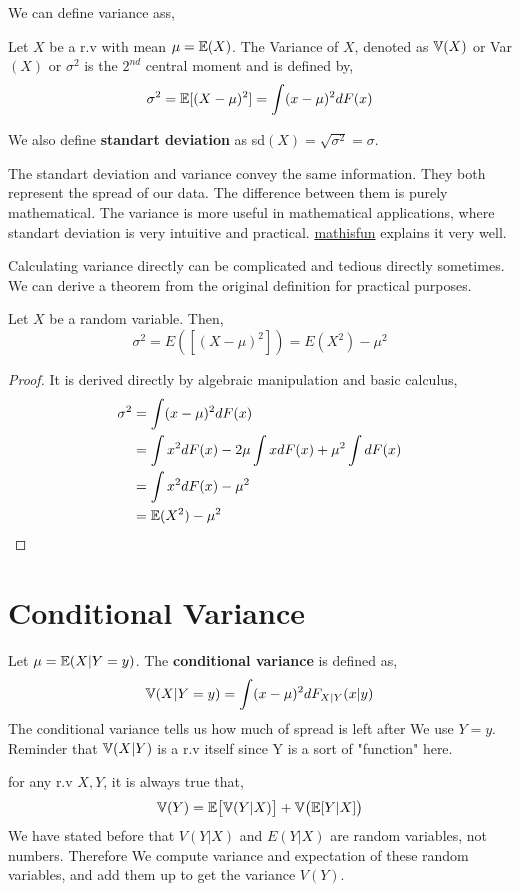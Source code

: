 We can define variance ass,
\begin{definition}
    Let $X$ be a r.v with mean $\mu = {\mathbb{E}}(X)$. The Variance of $X$, denoted as ${\mathbb{V}}(X)$ or  Var$(X)$ or $\sigma ^2$ is the $2^{nd}$ central moment and is defined by,
    \[ \sigma^2 = {\mathbb{E}} [(X- \mu)^2] = \int (x -\mu)^2 dF(x)\]
    
    We also define \textbf{standart deviation} as sd$(X) = \sqrt{\sigma^2}= \sigma$.
\end{definition}
The standart deviation and variance convey the same information. They both represent the spread of our data. 
The difference between them is purely mathematical. The variance is more useful in mathematical applications, where standart deviation is very intuitive and practical. 
\href{https://www.mathsisfun.com/data/standard-deviation.html}{mathisfun} explains it very well.
\par
Calculating variance directly can be complicated  and tedious directly sometimes. We can derive a theorem from the original definition for practical purposes.
\begin{theorem}
    Let $X$ be a random variable. Then,
    \[\sigma^2 = E([ (X-\mu)^2]) = E(X^2) - \mu^2\]
    \begin{proof}
        It is derived directly by algebraic manipulation and basic calculus,
        \begin{align*}
            \sigma^2 &= \int (x- \mu)^2 dF(x)  \\
                     &= \int x^2 dF(x) -2\mu \int x dF(x) + \mu^2 \int dF(x) \\
                     &= \int x^2 dF(x) - \mu^2 \\
                     &= {\mathbb{E}}(X^2) - \mu^2
        \end{align*}
    \end{proof}
\end{theorem}
\section{Conditional Variance}
\begin{definition}
    Let $\mu = {\mathbb{E}} (X |Y=y)$. The \textbf{conditional variance} is defined as,
    \[ {\mathbb{V}}(X| Y=y) = \int (x- \mu)^2 dF_{X|Y}(x|y)\]
    The conditional variance tells us how much of spread is left after  We use $Y=y$. Reminder that ${\mathbb{V}}(X|Y)$ is a r.v itself since Y is a sort of "function" here.
\end{definition}    
\begin{theorem} for any r.v $X,Y$, it is always true that,
    \[{\mathbb{V}}(Y)= {\mathbb{E}}\big[{\mathbb{V}}(Y|X)\big]+ {\mathbb{V}}\big({\mathbb{E}}[Y|X]\big)\]
    We have stated before that $V(Y|X)$ and $E(Y|X)$ are random variables, not numbers. Therefore We compute variance and expectation of these random variables, and add them up to get the variance $V(Y)$.
\end{theorem}
